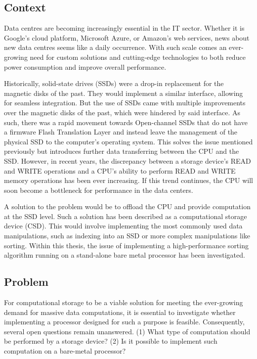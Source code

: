 \subsection{Context}\label{sec:context}
Data centres are becoming increasingly essential in the IT sector. Whether it is
Google's cloud platform, Microsoft Azure, or Amazon's web services, news about
new data centres seems like a daily occurrence. With such scale comes an
ever-growing need for custom solutions and cutting-edge technologies to both
reduce power consumption and improve overall performance.

Historically, solid-state drives (SSDs) were a drop-in replacement for the
magnetic disks of the past. They would implement a similar interface, allowing
for seamless integration. But the use of SSDs came with multiple improvements
over the magnetic disks of the past, which were hindered by said interface. As
such, there was a rapid movement towards Open-channel SSDs that do not have a
firmware Flash Translation Layer and instead leave the management of the
physical SSD to the computer's operating system. This solves the issue mentioned
previously but introduces further data transferring between the CPU and the SSD.
However, in recent years, the discrepancy between a storage device's READ and
WRITE operations and a CPU's ability to perform READ and WRITE memory operations
has been ever increasing. If this trend continues, the CPU will soon become a
bottleneck for performance in the data centers.

A solution to the problem would be to offload the CPU and provide computation at
the SSD level. Such a solution has been described as a computational storage
device (CSD). This would involve implementing the most commonly used data
manipulations, such as indexing into an SSD or more complex manipulations like
sorting. Within this thesis, the issue of implementing a high-performance
sorting algorithm running on a stand-alone bare metal processor has been
investigated.


\subsection{Problem}
For computational storage to be a viable solution for meeting the ever-growing
demand for massive data computations, it is essential to investigate whether
implementing a processor designed for such a purpose is feasible. Consequently,
several open questions remain unanswered. (1) What type of computation should be
performed by a storage device? (2) Is it possible to implement such computation
on a bare-metal processor?

